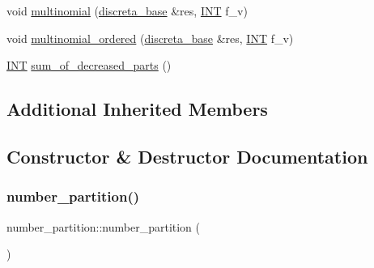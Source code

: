 \begin{DoxyCompactItemize}
\item 
void \mbox{\hyperlink{classnumber__partition_a62b34cba15a09ecc469517a9aa7d936d}{multinomial}} (\mbox{\hyperlink{classdiscreta__base}{discreta\+\_\+base}} \&res, \mbox{\hyperlink{galois_8h_a09fddde158a3a20bd2dcadb609de11dc}{I\+NT}} f\+\_\+v)
\item 
void \mbox{\hyperlink{classnumber__partition_a0d92a28d0d047c698d1c1c8fb93a6608}{multinomial\+\_\+ordered}} (\mbox{\hyperlink{classdiscreta__base}{discreta\+\_\+base}} \&res, \mbox{\hyperlink{galois_8h_a09fddde158a3a20bd2dcadb609de11dc}{I\+NT}} f\+\_\+v)
\item 
\mbox{\hyperlink{galois_8h_a09fddde158a3a20bd2dcadb609de11dc}{I\+NT}} \mbox{\hyperlink{classnumber__partition_ac1f48644e28737706fb6b04f7381da05}{sum\+\_\+of\+\_\+decreased\+\_\+parts}} ()
\end{DoxyCompactItemize}
\subsection*{Additional Inherited Members}


\subsection{Constructor \& Destructor Documentation}
\mbox{\label{classnumber__partition_a3caf56544328aedc42115b7b89056106}} 
\subsubsection{\texorpdfstring{number\+\_\+partition()}{number\_partition()}\hspace{0.1cm}{\footnotesize\ttfamily [1/3]}}
{\footnotesize\ttfamily number\+\_\+partition\+::number\+\_\+partition (\begin{DoxyParamCaption}{ }\end{DoxyParamCaption})}

\mbox{\label{classnumber__partition_a5c08f2f2afd49281b54e799bd5fc3faa}} 
